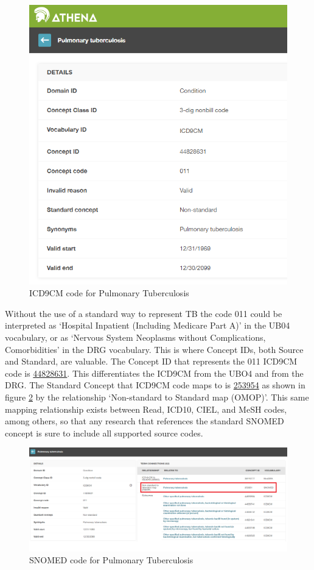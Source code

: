 \documentclass[]{book}
\begin{document}
\begin{figure}
\includegraphics[width=0.75\linewidth]{images/CommonDataModel/pulmTubICD9} \caption{ICD9CM code for Pulmonary Tuberculosis}\label{fig:pulmTubICD9}
\end{figure}

Without the use of a standard way to represent TB the code 011 could be
interpreted as `Hospital Inpatient (Including Medicare Part A)' in the
UB04 vocabulary, or as `Nervous System Neoplasms without Complications,
Comorbidities' in the DRG vocabulary. This is where Concept IDs, both
Source and Standard, are valuable. The Concept ID that represents the
011 ICD9CM code is
\href{http://athena.ohdsi.org/search-terms/terms/44828631}{44828631}.
This differentiates the ICD9CM from the UBO4 and from the DRG. The
Standard Concept that ICD9CM code maps to is
\href{http://athena.ohdsi.org/search-terms/terms/253954}{253954} as
shown in figure \ref{fig:pulmTubMap} by the relationship `Non-standard
to Standard map (OMOP)'. This same mapping relationship exists between
Read, ICD10, CIEL, and MeSH codes, among others, so that any research
that references the standard SNOMED concept is sure to include all
supported source codes.

\begin{figure}
\includegraphics[width=1\linewidth]{images/CommonDataModel/pulmTubMap} \caption{SNOMED code for Pulmonary Tuberculosis}\label{fig:pulmTubMap}
\end{figure}
\end{document}
